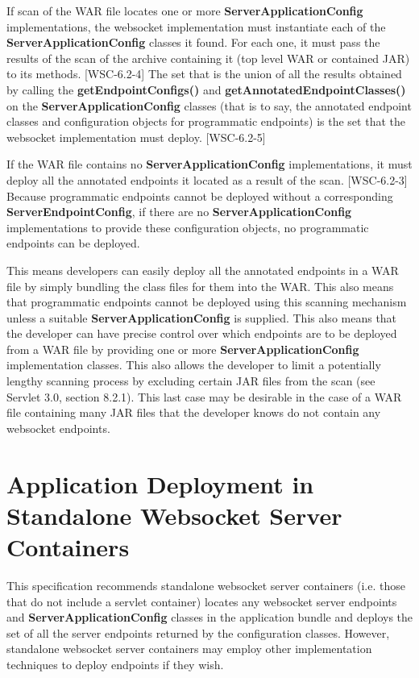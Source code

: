 If scan of the WAR file locates one or more \textbf{ServerApplicationConfig} implementations, the websocket implementation must instantiate each of the \textbf{ServerApplicationConfig} classes it found. For each one, it must pass the results of the scan of the archive containing it (top level WAR or contained JAR) to its methods. [WSC-6.2-4] The set that is the union of all the results obtained by calling the \textbf{getEndpointConfigs()} and \textbf{getAnnotatedEndpointClasses()} on the \textbf{ServerApplicationConfig} classes (that is to say, the annotated endpoint classes and configuration objects for programmatic endpoints) is the set that the websocket implementation must deploy. [WSC-6.2-5]

If the WAR file contains no \textbf{ServerApplicationConfig} implementations, it must deploy all the annotated endpoints it located as a result of the scan. [WSC-6.2-3] Because programmatic endpoints cannot be deployed without a corresponding \textbf{ServerEndpointConfig}, if there are no \textbf{ServerApplicationConfig} implementations to provide these configuration objects, no programmatic endpoints can be deployed.

\begin{nnnote}
This means developers can easily deploy all the annotated endpoints in a WAR file by simply bundling the class files for them into the WAR. This also means that programmatic endpoints cannot be deployed using this scanning mechanism unless a suitable \textbf{ServerApplicationConfig} is supplied. This also means that the developer can have precise control over which endpoints are to be deployed from a WAR file by providing one or more \textbf{ServerApplicationConfig} implementation classes. This also allows the developer to limit a potentially lengthy scanning process by excluding certain JAR files from the scan (see Servlet 3.0, section 8.2.1). This last case may be desirable in the case of a WAR file containing many JAR files that the developer knows do not contain any websocket endpoints.
\end{nnnote}

\section{Application Deployment in Standalone Websocket Server Containers}

This specification recommends standalone websocket server containers (i.e. those that do not include a servlet container) locates any websocket server endpoints and \textbf{ServerApplicationConfig} classes in the application bundle and deploys the set of all the server endpoints returned by the configuration classes. However, standalone websocket server containers may employ other implementation techniques to deploy endpoints if they wish.

